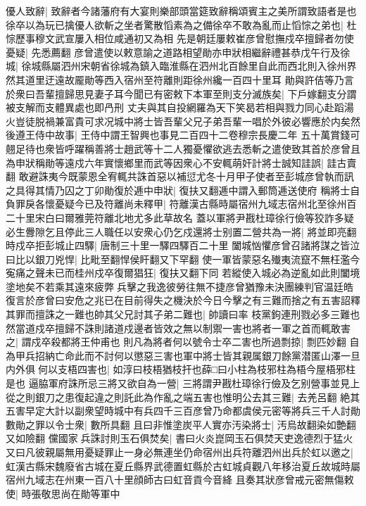 優人致辭|{
	致辭者今諸藩府有大宴則樂部頭當筵致辭稱頌賓主之美所謂致語者是也}
徐卒以為玩已擒優人欲斬之坐者驚散慆素為之備徐卒不敢為亂而止慆悰之弟也|{
	杜悰歷事穆文武宣屢入相位咸通初又為相}
先是朝廷屢敕崔彦曾慰撫戍卒擅歸者勿使憂疑|{
	先悉薦翻}
彦曾遣使以敕意諭之道路相望勛亦申狀相繼辭禮甚恭戊午行及徐城|{
	徐城縣屬泗州宋朝省徐城為鎮入臨淮縣在泗州北百餘里自此而西北則入徐州界然其道里迂遠故龎勛等西入宿州至符離則距徐州纔一百四十里耳}
勛與許佶等乃言於衆曰吾輩擅歸思見妻子耳今聞已有密敕下本軍至則支分滅族矣|{
	下戶嫁翻支分謂被支解而支體異處也即冎刑}
丈夫與其自投網羅為天下笑曷若相與戮力同心赴蹈湯火豈徒脱禍兼富貴可求况城中將士皆吾輩父兄子弟吾輩一唱於外彼必響應於内矣然後遵王侍中故事|{
	王侍中謂王智興也事見二百四十二卷穆宗長慶二年}
五十萬賞錢可翹足待也衆皆呼躍稱善將士趙武等十二人獨憂懼欲逃去悉斬之遣使致其首於彦曾且為申狀稱勛等遠戍六年實懷鄉里而武等因衆心不安輒萌奸計將士誠知詿誤|{
	詿古賣翻}
敢避誅夷今既蒙恩全宥輒共誅首惡以補愆尤冬十月甲子使者至彭城彦曾執而訊之具得其情乃囚之丁卯勛復於逓中申狀|{
	復扶又翻逓中謂入郵筒逓送使府}
稱將士自負罪戾各懷憂疑今已及符離尚未釋甲|{
	符離漢古縣時屬宿州九域志宿州北至徐州百二十里宋白曰爾雅莞符離北地尤多此草故名}
蓋以軍將尹戡杜璋徐行儉等狡詐多疑必生釁隙乞且停此三人職任以安衆心仍乞戍還將士别置二營共為一將|{
	將並即亮翻}
時戍卒拒彭城止四驛|{
	唐制三十里一驛四驛百二十里}
闔城忷懼彦曾召諸將謀之皆泣曰比以銀刀兇悍|{
	比毗至翻悍侯盰翻又下罕翻}
使一軍皆蒙惡名殱夷流竄不無枉濫今寃痛之聲未已而桂州戍卒復爾猖狂|{
	復扶又翻下同}
若縱使入城必為逆亂如此則闔境塗地矣不若乘其遠來疲弊兵擊之我逸彼勞往無不捷彦曾猶豫未決團練判官温廷皓復言於彦曾曰安危之兆已在目前得失之機決於今日今擊之有三難而捨之有五害詔釋其罪而擅誅之一難也帥其父兄討其子弟二難也|{
	帥讀曰率}
枝黨鉤連刑戮必多三難也然當道戍卒擅歸不誅則諸道戍邊者皆效之無以制禦一害也將者一軍之首而輒敢害之|{
	謂戍卒殺都將王仲甫也}
則凡為將者何以號令士卒二害也所過剽掠|{
	剽匹妙翻}
自為甲兵招納亡命此而不討何以懲惡三害也軍中將士皆其親属銀刀餘黨潜匿山澤一旦内外俱何以支梧四害也|{
	如淳曰枝梧猶枝扞也薛□曰小柱為枝邪柱為梧今屋梧邪柱是也}
逼脇軍府誅所忌三將又欲自為一營|{
	三將謂尹戡杜璋徐行儉及乞别營事並見上}
從之則銀刀之患復起違之則託此為作亂之端五害也惟明公去其三難|{
	去羌呂翻}
絶其五害早定大計以副衆望時城中有兵四千三百彦曾乃命都虞侯元密等將兵三千人討勛數勛之罪以令士衆|{
	數所具翻}
且曰非惟塗炭平人實亦汚染將士|{
	汚烏故翻染如艶翻又如險翻}
儻國家兵誅討則玉石俱焚矣|{
	書曰火炎崑岡玉石俱焚天吏逸德烈于猛火}
又曰凡彼親屬無用憂疑罪止一身必無連坐仍命宿州出兵符離泗州出兵於虹以邀之|{
	虹漢古縣宋魏廢省古城在夏丘縣界武德置虹縣於古虹城貞觀八年移治夏丘故城時屬宿州九域志在州東一百八十里顔師古曰虹音貢今音絳}
且奏其狀彦曾戒元密無傷敕使|{
	時張敬思尚在勛等軍中}
